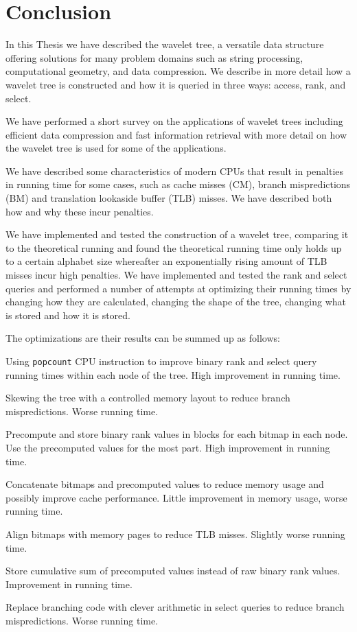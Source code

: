 \section{Conclusion}
In this Thesis we have described the wavelet tree, a versatile data structure offering solutions for many problem domains such as string processing, computational geometry, and data compression.
We describe in more detail how a wavelet tree is constructed and how it is queried in three ways: access, rank, and select.

We have performed a short survey on the applications of wavelet trees including efficient data compression and fast information retrieval with more detail on how the wavelet tree is used for some of the applications.

We have described some characteristics of modern CPUs that result in penalties in running time for some cases, such as cache misses (CM), branch mispredictions (BM) and translation lookaside buffer (TLB) misses.
We have described both how and why these incur penalties.

We have implemented and tested the construction of a wavelet tree, comparing it to the theoretical running and found the theoretical running time only holds up to a certain alphabet size whereafter an exponentially rising amount of TLB misses incur high penalties.
We have implemented and tested the rank and select queries and performed a number of attempts at optimizing their running times by changing how they are calculated, changing the shape of the tree, changing what is stored and how it is stored.

The optimizations are their results can be summed up as follows:

\begin{description*}
\item[Using \texttt{popcount} CPU instruction] to improve binary rank and select query running times within each node of the tree. High improvement in running time.
\item[Skewing the tree] with a controlled memory layout to reduce branch mispredictions. Worse running time.
\item[Precompute and store binary rank values] in blocks for each bitmap in each node. Use the precomputed values for the most part. High improvement in running time.
\item[Concatenate bitmaps and precomputed values] to reduce memory usage and possibly improve cache performance. Little improvement in memory usage, worse running time.
\item[Align bitmaps with memory pages] to reduce TLB misses. Slightly worse running time.
\item[Store cumulative sum of precomputed values] instead of raw binary rank values. Improvement in running time.
\item[Replace branching code with clever arithmetic] in select queries to reduce branch mispredictions. Worse running time.
\end{description*}
